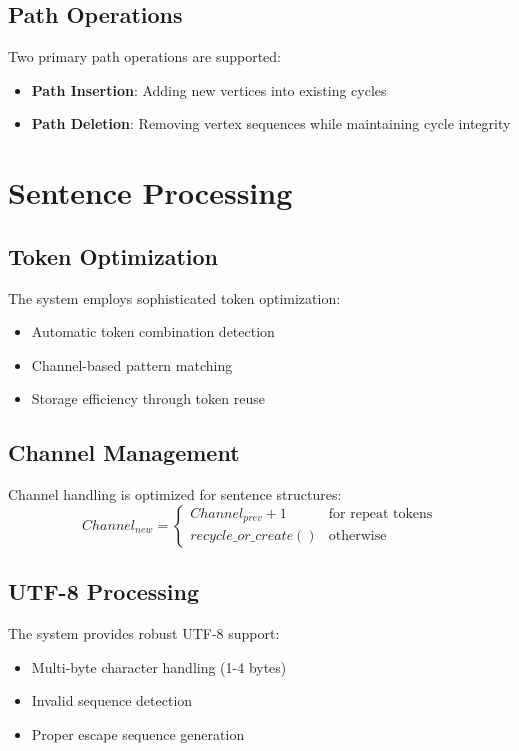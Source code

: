 \subsection{Path Operations}
Two primary path operations are supported:
\begin{itemize}
    \item \textbf{Path Insertion}: Adding new vertices into existing cycles
    \item \textbf{Path Deletion}: Removing vertex sequences while maintaining cycle integrity
\end{itemize}

\section{Sentence Processing}\label{Sec:Sentences}
\subsection{Token Optimization}
The system employs sophisticated token optimization:
\begin{itemize}
    \item Automatic token combination detection
    \item Channel-based pattern matching
    \item Storage efficiency through token reuse
\end{itemize}

\subsection{Channel Management}
Channel handling is optimized for sentence structures:
\begin{equation}
    Channel_{new} = \begin{cases}
        Channel_{prev} + 1 & \text{for repeat tokens} \\
        recycle\_or\_create() & \text{otherwise}
    \end{cases}
\end{equation}

\subsection{UTF-8 Processing}
The system provides robust UTF-8 support:
\begin{itemize}
    \item Multi-byte character handling (1-4 bytes)
    \item Invalid sequence detection
    \item Proper escape sequence generation
\end{itemize}

